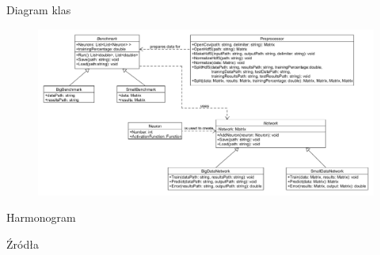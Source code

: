 \documentclass{beamer}
\begin{document}
\begin{frame}{Diagram klas}
\begin{figure}
	\includegraphics[scale=0.26]{classes.png}
\end{figure}
\end{frame}


\begin{frame}{Harmonogram}

\end{frame}


\begin{frame}{Źródła}

\end{frame}
\end{document}
